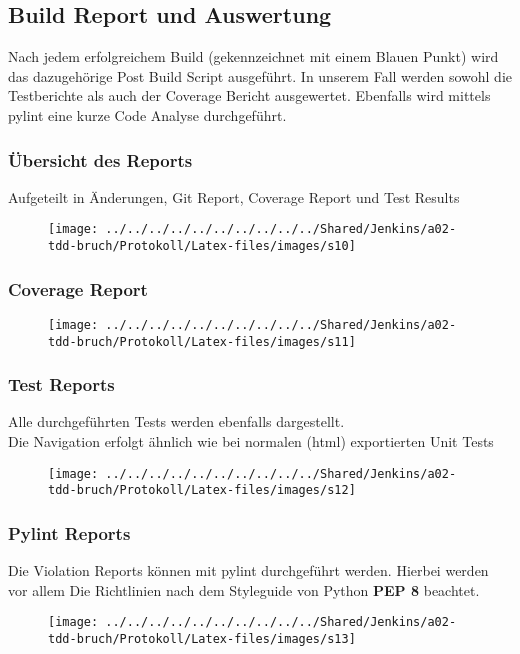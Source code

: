 \subsection{Build Report und Auswertung}
Nach jedem erfolgreichem Build (gekennzeichnet mit einem Blauen Punkt) wird das dazugehörige Post Build Script ausgeführt. In unserem Fall werden sowohl die Testberichte als auch der Coverage Bericht ausgewertet. Ebenfalls wird mittels pylint eine kurze Code Analyse durchgeführt.

\subsubsection{Übersicht des Reports}
Aufgeteilt in Änderungen, Git Report, Coverage Report und Test Results
\begin{figure}[!h]
	\centering
	\texttt{[image: ../../../../../../../../../../Shared/Jenkins/a02-tdd-bruch/Protokoll/Latex-files/images/s10]}
	\label{fig:s10}
\end{figure}

\subsubsection{Coverage Report}
\begin{figure}[!h]
	\centering
	\texttt{[image: ../../../../../../../../../../Shared/Jenkins/a02-tdd-bruch/Protokoll/Latex-files/images/s11]}
	\label{fig:s11}
\end{figure}

\subsubsection{Test Reports}
Alle durchgeführten Tests werden ebenfalls dargestellt.\\
Die Navigation erfolgt ähnlich wie bei normalen (html) exportierten Unit Tests
\begin{figure}[!h]
	\centering
	\texttt{[image: ../../../../../../../../../../Shared/Jenkins/a02-tdd-bruch/Protokoll/Latex-files/images/s12]}
	\label{fig:s12}
\end{figure}

\subsubsection{Pylint Reports}
Die Violation Reports können mit pylint durchgeführt werden. Hierbei werden vor allem Die Richtlinien nach dem Styleguide von Python \textbf{PEP 8} beachtet.
\begin{figure}[!h]
	\centering
	\texttt{[image: ../../../../../../../../../../Shared/Jenkins/a02-tdd-bruch/Protokoll/Latex-files/images/s13]}
	\label{fig:s13}
\end{figure}

